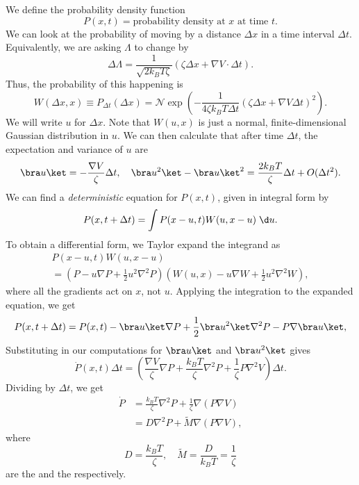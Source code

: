 \documentclass[a4paper]{article}
\begin{document}
We define the probability density function
\[
  P(x, t) = \text{probability density at $x$ at time $t$}.
\]
We can look at the probability of moving by a distance $\Delta x$ in a time interval $\Delta t$. Equivalently, we are asking $\Lambda$ to change by
\[
  \Delta \Lambda = \frac{1}{\sqrt{2k_B T \zeta}} (\zeta \Delta x + \nabla V \cdot \Delta t).
\]
Thus, the probability of this happening is
\[
  W(\Delta x, x) \equiv P_{\Delta t}(\Delta x) = \mathcal{N} \exp \left(-\frac{1}{4 \zeta k_B T \Delta t} (\zeta \Delta x + \nabla V \Delta t)^2\right).
\]
We will write $u$ for $\Delta x$. Note that $W(u, x)$ is just a normal, finite-dimensional Gaussian distribution in $u$. We can then calculate that after time $\Delta t$, the expectation and variance of $u$ are
\[
  \bra u\ket = - \frac{\nabla V}{\zeta} \Delta t,\quad \bra u^2\ket - \bra u\ket^2 = \frac{2k_B T}{\zeta} \Delta t + O(\Delta t^2).
\]
We can find a \emph{deterministic} equation for $P(x, t)$, given in integral form by
\[
  P(x, t + \Delta t) = \int P(x - u, t) W(u, x - u)\;\d u.
\]
To obtain a differential form, we Taylor expand the integrand as
\begin{multline*}
  P(x - u, t) W(u, x - u) \\
  = \left(P - u \nabla P + \frac{1}{2} u^2 \nabla^2 P\right)\left(W(u, x) - u \nabla W + \frac{1}{2} u^2 \nabla^2 W\right),
\end{multline*}
where all the gradients act on $x$, not $u$. Applying the integration to the expanded equation, we get
\[
  P(x, t + \Delta t) = P(x, t) - \bra u \ket \nabla P + \frac{1}{2} \bra u^2\ket \nabla^2 P - P \nabla \bra u\ket,
\]
Substituting in our computations for $\bra u\ket$ and $\bra u^2\ket$ gives
\[
  \dot{P}(x, t) \Delta t = \left(\frac{\nabla V}{\zeta} \nabla P + \frac{k_B T}{\zeta} \nabla^2 P + \frac{1}{\zeta} P \nabla^2 V \right)\Delta t.
\]
Dividing by $\Delta t$, we get
\begin{align*}
  \dot{P} &= \frac{k_B T}{\zeta} \nabla^2 P + \frac{1}{\zeta} \nabla(P \nabla V)\\
  &= D \nabla^2 P + \tilde{M} \nabla(P \nabla V),
\end{align*}
where
\[
  D = \frac{k_B T}{\zeta},\quad \tilde{M} = \frac{D}{k_B T} = \frac{1}{\zeta}
\]
are the  and the  respectively.
\end{document}
